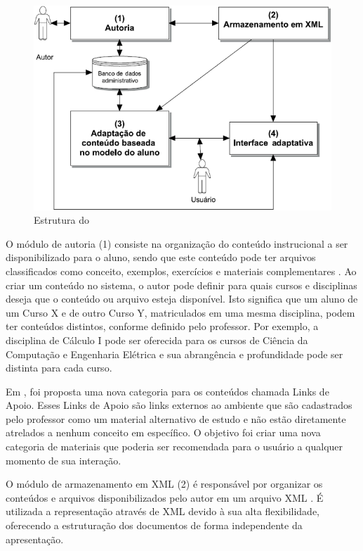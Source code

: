 \begin{figure}[htb]
  \caption{\label{fig:adaptweb-arquitetura}Estrutura do \adaptweb}
  \begin{center}
      \includegraphics[scale=1.0]{./Figuras/adaptweb-arquitetura.png}
  \end{center}
\end{figure}

O módulo de autoria (1) consiste na organização do conteúdo instrucional a ser disponibilizado para o aluno, sendo que
este conteúdo pode ter arquivos classificados como conceito, exemplos, exercícios e materiais complementares
\cite{gasparini2003interface}. Ao criar um conteúdo no sistema, o autor pode definir para quais cursos e disciplinas
deseja que o conteúdo ou arquivo esteja disponível. Isto significa que um aluno de um Curso X e de outro Curso Y,
matriculados em uma mesma disciplina, podem ter conteúdos distintos, conforme definido pelo professor. Por exemplo, a
disciplina de Cálculo I pode ser oferecida para os cursos de Ciência da Computação e Engenharia Elétrica e sua
abrangência e profundidade pode ser distinta para cada curso.

Em , foi proposta uma nova categoria para os conteúdos chamada Links de Apoio. Esses Links de Apoio
são links externos ao ambiente \adaptwebspace que são cadastrados pelo professor como um
material alternativo de estudo e não estão diretamente atrelados a nenhum conceito em específico. O objetivo foi criar
uma nova categoria de materiais que poderia ser recomendada para o usuário a qualquer momento de sua interação.

O módulo de armazenamento em XML (2) é responsável por organizar os conteúdos e arquivos disponibilizados pelo autor em
um arquivo XML \cite{gasparini2003interface}. É utilizada a representação através de XML devido à sua alta
flexibilidade, oferecendo a estruturação dos documentos de forma independente da apresentação.

